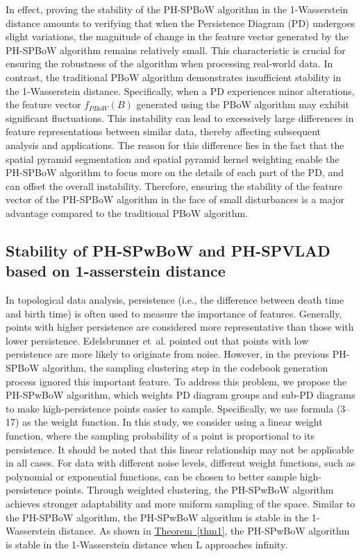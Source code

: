 \documentclass[5GeSdc,ASOC,numref,printGA,printHL,CASflow,nocrossmark,longtitle,PROOF]{/usr/local/texlive/iTemplates/01-Templates/01-Els-Jnl/01-Standard_Templates/V1/ELS_MDL5-V1-6}
\begin{document}
\begin{articlestyle}
In effect, proving the stability of the PH-SPBoW algorithm in the 1-Wasserstein distance amounts to verifying that when the Persistence Diagram (PD) undergoes slight variations, the magnitude of change in the feature vector generated by the PH-SPBoW algorithm remains relatively small. This characteristic is crucial for ensuring the robustness of the algorithm when processing real-world data. In contrast, the traditional PBoW algorithm demonstrates insufficient stability in the 1-Wasserstein distance. Specifically, when a PD experiences minor alterations, the feature vector $f_{PBoW} (B)$ generated using the PBoW algorithm may exhibit significant fluctuations. This instability can lead to excessively large differences in feature representations between similar data, thereby affecting subsequent analysis and applications. The reason for this difference lies in the fact that the spatial pyramid segmentation and spatial pyramid kernel weighting enable the PH-SPBoW algorithm to focus more on the details of each part of the PD, and can offset the overall instability. Therefore, ensuring the stability of the feature vector of the PH-SPBoW algorithm in the face of small disturbances is a major advantage compared to the traditional PBoW algorithm.

\subsection{Stability of PH-SPwBoW and PH-SPVLAD based on 1-asserstein distance}\label{sec4.2}

In topological data analysis, persistence (i.e., the difference between death time and birth time) is often used to measure the importance of features. Generally, points with higher persistence are considered more representative than those with lower persistence. Edelsbrunner et~al. \cite{edelsbrunner2010computational} pointed out that points with low persistence are more likely to originate from noise. However, in the previous PH-SPBoW algorithm, the sampling clustering step in the codebook generation process ignored this important feature. To address this problem, we propose the PH-SPwBoW algorithm, which weights PD diagram groups and sub-PD diagrams to make high-persistence points easier to sample. Specifically, we use formula (3--17) as the weight function. In this study, we consider using a linear weight function, where the sampling probability of a point is proportional to its persistence. It should be noted that this linear relationship may not be applicable in all cases. For data with different noise levels, different weight functions, such as polynomial or exponential functions, can be chosen to better sample high-persistence points. Through weighted clustering, the PH-SPwBoW algorithm achieves stronger adaptability and more uniform sampling of the space. Similar to the PH-SPBoW algorithm, the PH-SPwBoW algorithm is stable in the 1-Wasserstein distance. As shown in \hyperref[thm1]{Theorem~\ref{thm1}}, the PH-SPwBoW algorithm is stable in the 1-Wasserstein distance when L approaches infinity.


\end{articlestyle}
\end{document}
